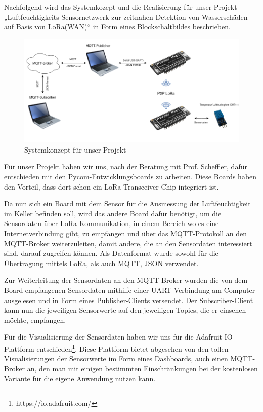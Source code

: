 Nachfolgend wird das Systemkozept und die Realisierung für unser Projekt „Luftfeuchtigkeits-Sensornetzwerk zur zeitnahen Detektion von Wasserschäden auf Basis von LoRa(WAN)“ in Form eines Blockschaltbildes beschrieben. 

\begin{figure}[h]
 \centering
 \includegraphics[width=1\textwidth]{pictures/Blockschaltbild_ProNeSy}
 \caption[Systemkonzept für unser Projekt]{Systemkonzept für unser Projekt}
 \label{fig:systemkonzept}
\end{figure}

Für unser Projekt haben wir uns, nach der Beratung mit Prof. Scheffler, dafür entschieden mit den Pycom-Entwicklungsboards zu arbeiten. Diese Boards haben den Vorteil, dass dort schon ein LoRa-Transceiver-Chip integriert ist. 

Da nun sich ein Board mit dem Sensor für die Ausmessung der Luftfeuchtigkeit im Keller befinden soll, wird das andere Board dafür benötigt, um die Sensordaten über LoRa-Kommunikation, in einem Bereich wo es eine Internetverbindung gibt, zu empfangen und über das MQTT-Protokoll an den MQTT-Broker weiterzuleiten, damit andere, die an den Sensordaten interessiert sind, darauf zugreifen können. Als Datenformat wurde sowohl für die Übertragung mittels LoRa, als auch MQTT, JSON verwendet.

Zur Weiterleitung der Sensordaten an den MQTT-Broker wurden die von dem Board empfangenen Sensordaten mithilfe einer UART-Verbindung am Computer ausgelesen und in Form eines Publisher-Clients versendet. Der Subscriber-Client kann nun die jeweiligen Sensorwerte auf den jeweiligen Topics, die er einsehen möchte, empfangen.

Für die Visualisierung der Sensordaten haben wir uns für die Adafruit IO Plattform entschieden\footnote{https://io.adafruit.com/}. Diese Plattform bietet abgesehen von den tollen Visualisierungen der Sensorwerte im Form eines Dashboards, auch einen MQTT-Broker an, den man mit einigen bestimmten Einschränkungen bei der kostenlosen Variante für die eigene Anwendung nutzen kann. 